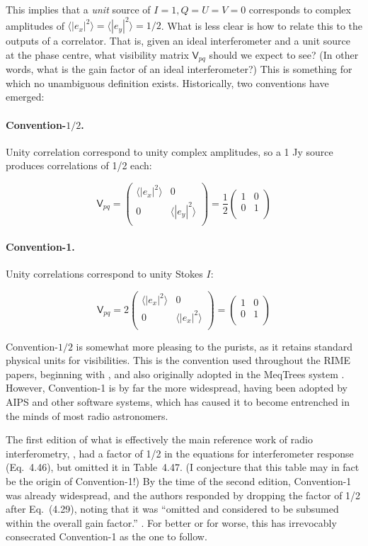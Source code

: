 \documentclass[referee]{aa}
\newcommand{\matrixtt}[4]{\left( \begin{array}{cc}#1&#2\\#3&#4\\\end{array} \right)}
\newcommand{\coh}[2]{\mathsf{{#1}}_{{#2}}}
\begin{document}
This implies that a {\em unit} source of $I=1, Q=U=V=0$ corresponds to complex amplitudes of $\langle |e_x|^2\rangle =\langle |e_y|^2\rangle = 1/2$. What is less clear is how to relate this to the outputs of a correlator. That is, given an ideal interferometer and a unit source at the phase centre, what visibility matrix $\coh{V}{pq}$ should we expect to see? (In other words, what is the gain factor of an ideal interferometer?) This is something for which no unambiguous definition exists. Historically, two conventions have emerged:

\paragraph{Convention-$\scriptstyle 1/2$.} Unity correlation correspond to unity complex amplitudes, so a 1 Jy source produces correlations of 1/2 each: 

\[
\coh{V}{pq} = \matrixtt{\langle |e_x|^2\rangle }{0}{0}{\langle |e_y|^2\rangle } = \frac{1}{2}\matrixtt{1}{0}{0}{1}
\]

\paragraph{Convention-1.} Unity correlations correspond to unity Stokes $I$:

\[
\coh{V}{pq} = 2\matrixtt{\langle |e_x|^2\rangle }{0}{0}{\langle |e_x|^2\rangle } = \matrixtt{1}{0}{0}{1}
\]

Convention-$\scriptstyle 1/2$ is somewhat more pleasing to the purists, as it retains standard physical units for visibilities. This is the convention used throughout the RIME papers, beginning with \citet{ME1}, and also originally adopted in the MeqTrees system \citep{meqtrees}. However, Convention-1 is by far the more widespread, having been adopted by AIPS and other software systems, which has caused it to become entrenched in the minds of most radio astronomers.

The first edition of what is effectively the main reference work of radio interferometry, \citet*{tms1}, had a factor of 1/2 in the equations for interferometer response (Eq.~4.46), but omitted it in Table~4.47. (I conjecture that this table may in fact be the origin of Convention-1!) By the time of the second edition, Convention-1 was already widespread, and the authors responded by dropping the factor of 1/2 after Eq.~(4.29), noting that it was ``omitted and considered to be subsumed within the overall gain factor.'' \citep[see p. 102]{tms}. For better or for worse, this has irrevocably consecrated Convention-1 as the one to follow.
\end{document}
